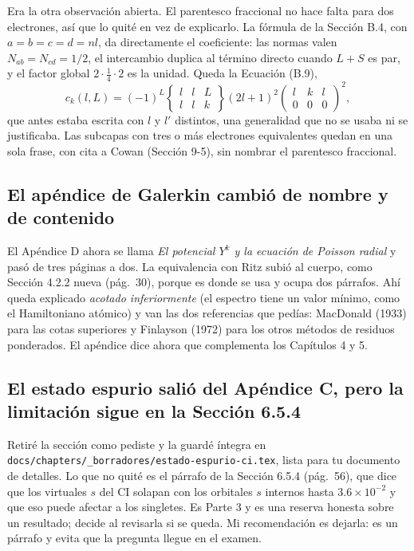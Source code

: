 \documentclass[11pt,a4paper]{article}
\newcommand{\arch}[1]{\texttt{\small #1}}
\begin{document}
Era la otra observación abierta. El parentesco fraccional no hace falta para dos electrones, así
que lo quité en vez de explicarlo. La fórmula de la Sección B.4, con $a=b=c=d=nl$, da directamente
el coeficiente: las normas valen $N_{ab}=N_{cd}=1/2$, el intercambio duplica al término directo
cuando $L+S$ es par, y el factor global $2\cdot\tfrac14\cdot2$ es la unidad. Queda la
Ecuación (B.9),
\[
c_k(l,L)=(-1)^L\begin{Bmatrix} l&l&L\\ l&l&k\end{Bmatrix}(2l+1)^2
\begin{pmatrix} l&k&l\\0&0&0\end{pmatrix}^2 ,
\]
que antes estaba escrita con $l$ y $l'$ distintos, una generalidad que no se usaba ni se
justificaba. Las subcapas con tres o más electrones equivalentes quedan en una sola frase, con
cita a Cowan (Sección 9-5), sin nombrar el parentesco fraccional.

\subsection{El apéndice de Galerkin cambió de nombre y de contenido}

El Apéndice D ahora se llama \emph{El potencial $Y^k$ y la ecuación de Poisson radial} y pasó de
tres páginas a dos. La equivalencia con Ritz subió al cuerpo, como Sección 4.2.2 nueva (pág.~30),
porque es donde se usa y ocupa dos párrafos. Ahí queda explicado \emph{acotado inferiormente}
(el espectro tiene un valor mínimo, como el Hamiltoniano atómico) y van las dos referencias que
pedías: MacDonald (1933) para las cotas superiores y Finlayson (1972) para los otros métodos de
residuos ponderados. El apéndice dice ahora que complementa los Capítulos 4 y 5.

\subsection{El estado espurio salió del Apéndice C, pero la limitación sigue en la Sección 6.5.4}

Retiré la sección como pediste y la guardé íntegra en
\arch{docs/chapters/\_borradores/estado-espurio-ci.tex}, lista para tu documento de detalles.
Lo que no quité es el párrafo de la Sección 6.5.4 (pág.~56), que dice que los virtuales $s$ del CI
solapan con los orbitales $s$ internos hasta $3.6\times10^{-2}$ y que eso puede afectar a los
singletes. Es Parte 3 y es una reserva honesta sobre un resultado; decide al revisarla si se queda.
Mi recomendación es dejarla: es un párrafo y evita que la pregunta llegue en el examen.
\end{document}
